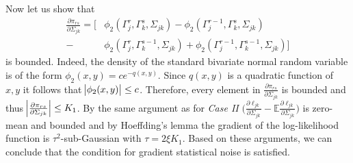 \begin{condition}
    Now let us show that
    \begin{align*}
        \frac{\partial \pi_{rs}}{\partial \Sigma_{jk}}
        = \Big[&\phi_2({\Gamma}_j^r, {\Gamma}_k^s, \Sigma_{jk}) - \phi_2({\Gamma}_j^{r-1}, {\Gamma}_k^s, \Sigma_{jk}) \\
        - &\phi_2({\Gamma}_j^r, {\Gamma}_k^{s-1}, \Sigma_{jk}) + \phi_2({\Gamma}_j^{r-1}, {\Gamma}_k^{s-1}, \Sigma_{jk})\Big]
    \end{align*}
    is bounded. Indeed, the density of the standard bivariate normal random variable is of the form $\phi_2(x,y) = c e^{-q(x,y)}$. Since $q(x,y)$ is a quadratic function of $x,y$ it follows that $\abs{\phi_2(x,y)} \leq c$. Therefore, every element in $\frac{\partial \pi_{rs}}{\partial \Sigma_{jk}}$ is bounded and thus $\abs{\frac{\partial \pi_{rs}}{\partial \Sigma_{jk}}} \leq K_1$. By the same argument as for \textit{Case II} $\Big(\frac{\partial\ell_{jk}}{\partial \Sigma_{jk}} - \mathbb{E}\frac{\partial\ell_{jk}}{\partial \Sigma_{jk}} \Big)$ is zero-mean and bounded and by Hoeffding's lemma the gradient of the log-likelihood function is $\tau^2$-sub-Gaussian with $\tau = 2\xi K_1$. Based on these arguments, we can conclude that the condition for gradient statistical noise is satisfied.
\end{condition}


